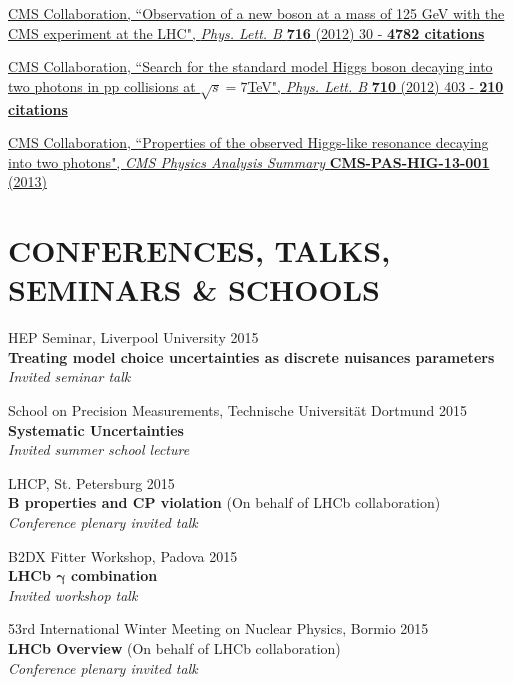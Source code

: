 \documentclass[margin, 10pt]{res} %
\begin{document}
\begin{resume}
\href{http://inspirehep.net/record/1124338}{CMS Collaboration, ``Observation of a new boson at a mass of 125 GeV with the CMS experiment at the LHC",
\textit{Phys. Lett. B}
\textbf{716} (2012) 30 - \textbf{4782 citations}
}

\href{http://inspirehep.net/record/1088230}{CMS Collaboration, ``Search for the standard model Higgs boson decaying into two photons in pp collisions at $\sqrt{s}=7$TeV",
\textit{Phys. Lett. B}
\textbf{710} (2012) 403 - \textbf{210 citations}
}

\href{http://inspirehep.net/record/1260840}{CMS Collaboration, ``Properties of the observed Higgs-like resonance decaying into two photons",
\textit{CMS Physics Analysis Summary}
\textbf{CMS-PAS-HIG-13-001} (2013)%
}


\section{CONFERENCES, TALKS, SEMINARS \& SCHOOLS}

HEP Seminar, Liverpool University 2015 \\
\textbf{Treating model choice uncertainties as discrete nuisances parameters} \\
\textit{Invited seminar talk}

School on Precision Measurements, Technische Universit\"{a}t Dortmund 2015 \\
\textbf{Systematic Uncertainties} \\
\textit{Invited summer school lecture}


LHCP, St. Petersburg 2015 \\
\textbf{B properties and CP violation} (On behalf of LHCb collaboration) \\
\textit{Conference plenary invited talk}

B2DX Fitter Workshop, Padova 2015 \\
\textbf{LHCb $\mathbf{\gamma}$ combination}\\
\textit{Invited workshop talk}

53rd International Winter Meeting on Nuclear Physics, Bormio 2015 \\
\textbf{LHCb Overview} (On behalf of LHCb collaboration) \\
\textit{Conference plenary invited talk}


\end{resume}
\end{document}
